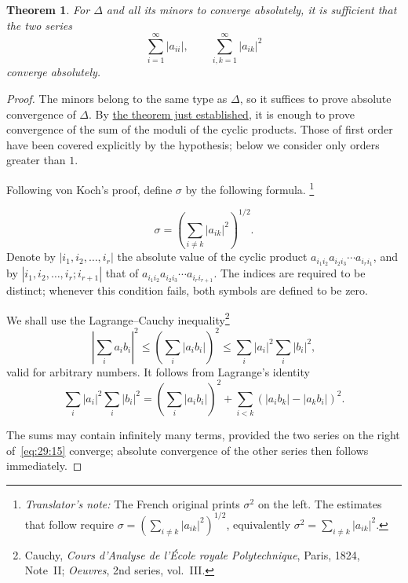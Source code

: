 \documentclass[
  paper=b5,
  fontsize=13pt,
  twoside=true,
  open=any,
  bookmarkpackage=false,
  chapterprefix=true,
  headings=normal
]{scrbook}
\newtheorem*{theorem}{Theorem}
\theoremstyle{definition}
\newcounter{translatornote}
\newcommand{\translatornotelabel}{T\arabic{translatornote}}
\newcommand{\translatornote}[1]{%
  \stepcounter{translatornote}%
  \begingroup
    \edef\savedfootnotenumber{\number\value{footnote}}%
    \renewcommand{\thefootnote}{\translatornotelabel}%
    \footnote{\emph{Translator's note:} #1}%
    \setcounter{footnote}{\savedfootnotenumber}%
  \endgroup
}
\begin{document}
\begin{theorem}
For $\Delta$ and all its minors to converge absolutely, it is sufficient that the two series
\[
  \sum_{i=1}^{\infty}|a_{ii}|,
  \qquad
  \sum_{i,k=1}^{\infty}|a_{ik}|^2
\]
  converge
  absolutely.
\end{theorem}
\begin{proof}
The minors belong to the same type as $\Delta$, so it suffices to prove absolute convergence of $\Delta$. By \hyperref[sec:28]{the theorem just established}, it is enough to prove convergence of the sum of the moduli of the cyclic products. Those of first order have been covered explicitly by the hypothesis; below we consider only orders greater than $1$.

Following von Koch's proof, define \(\sigma\) by the following formula.\translatornote{The French original prints \(\sigma^2\) on the left.  The estimates that follow require \(\sigma=(\sum_{i\ne k}|a_{ik}|^2)^{1/2}\), equivalently \(\sigma^2=\sum_{i\ne k}|a_{ik}|^2\).}
\[
  \sigma=\left(\sum_{i\ne k}|a_{ik}|^2\right)^{1/2}.
\]
Denote by $|i_1,i_2,\ldots,i_r|$ the absolute value of the cyclic product $a_{i_1i_2}a_{i_2i_3}\cdots a_{i_ri_1}$, and by $|i_1,i_2,\ldots,i_r;i_{r+1}|$ that of $a_{i_1i_2}a_{i_2i_3}\cdots a_{i_ri_{r+1}}$. The indices are required to be distinct; whenever this condition fails, both symbols are defined to be zero.

We shall use the Lagrange--Cauchy inequality\footnote{Cauchy, \emph{Cours d'Analyse de l'\'Ecole royale Polytechnique}, Paris, 1824, Note~II; \emph{Oeuvres}, 2nd series, vol.~III.}
\begin{equation}
 \left|\sum_i a_ib_i\right|^2
 \leq\left(\sum_i|a_ib_i|\right)^2
 \leq\sum_i|a_i|^2\sum_i|b_i|^2,
 \tag{15}\label{eq:29:15}
\end{equation}
valid for arbitrary numbers. It follows from Lagrange's identity
\[
 \sum_i|a_i|^2\sum_i|b_i|^2
 =\left(\sum_i|a_ib_i|\right)^2
 +\sum_{i<k}(|a_ib_k|-|a_kb_i|)^2.
\]

The sums may contain infinitely many terms, provided the two series on the right of~\eqref{eq:29:15} converge; absolute convergence of the other series then follows immediately.


\end{proof}
\end{document}
